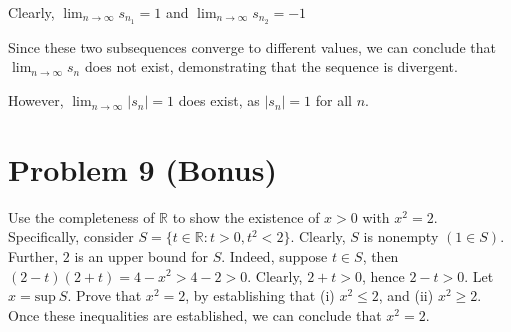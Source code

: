 \documentclass{article}
\begin{document}
Clearly, $\lim_{n \to \infty} s_{n_1} = 1$ and $\lim_{n \to \infty} s_{n_2} = -1$

Since these two subsequences converge to different values, we can conclude that $\lim_{n \to \infty} s_n$ does not exist, demonstrating that the sequence is divergent.

However, $\lim_{n \to \infty} |s_n| = 1$ does exist, as $|s_n| = 1$ for all $n$.

\section*{Problem 9 (Bonus)}
Use the completeness of $\mathbb{R}$ to show the existence of $x>0$ with $x^2=2$. Specifically, consider $S=\{t\in \mathbb{R} : t>0, t^2<2\}$. Clearly, $S$ is nonempty $(1\in S)$. Further, $2$ is an upper bound for $S$. Indeed, suppose $t\in S$, then $(2-t)(2+t)=4-x^2>4-2>0$. Clearly, $2+t>0$, hence $2-t>0$. 
Let $x=\text{sup} \ S$. Prove that $x^2=2$, by establishing that (i) $x^2\leq 2$, and (ii) $x^2\geq 2$. Once these inequalities are established, we can conclude that $x^2=2$.
\end{document}
